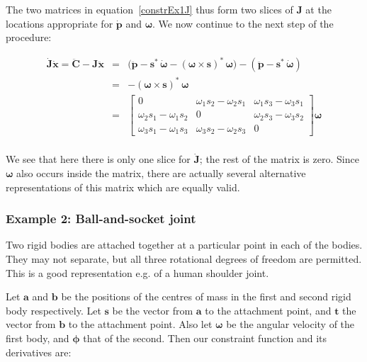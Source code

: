 The two matrices in equation~\ref{constrEx1J} thus form two slices of $\mathbf{J}$ at
the locations appropriate for $\dot{\mathbf{p}}$ and $\bm{\omega}$. We now continue to the
next step of the procedure:

\begin{eqnarray}
\dot{\mathbf{J}}\dot{\mathbf{x}} = 
\ddot{\mathbf{C}} - \mathbf{J}\ddot{\mathbf{x}} &=&
    \big(\ddot{\mathbf{p}} - \mathbf{s}^*\,\dot{\bm{\omega}} -
    (\bm{\omega}\times\mathbf{s})^*\,\bm{\omega}\big) -
    (\ddot{\mathbf{p}} - \mathbf{s}^*\,\dot{\bm{\omega}}) \nonumber\\
& = & -(\bm{\omega}\times\mathbf{s})^*\,\bm{\omega} \nonumber\\
& = & \left[\begin{array}{ccc} 0 &
    \omega_1 s_2 - \omega_2 s_1 &
    \omega_1 s_3 - \omega_3 s_1 \\
    \omega_2 s_1 - \omega_1 s_2 & 0 &
    \omega_2 s_3 - \omega_3 s_2 \\
    \omega_3 s_1 - \omega_1 s_3 &
    \omega_3 s_2 - \omega_2 s_3 & 0
    \end{array}\right] \bm{\omega} \nonumber\\\label{constrEx1JDot}
\end{eqnarray}

We see that here there is only one slice for $\dot{\mathbf{J}}$; the rest of the matrix
is zero. Since $\bm{\omega}$ also occurs inside the matrix, there are actually several
alternative representations of this matrix which are equally valid.

\subsubsection{Example 2: Ball-and-socket joint}

Two rigid bodies are attached together at a particular point in each of the bodies.
They may not separate, but all three rotational degrees of freedom are permitted. This is
a good representation e.g. of a human shoulder joint.

Let $\mathbf{a}$ and $\mathbf{b}$ be the positions of the centres of mass in the first and
second rigid body respectively. Let $\mathbf{s}$ be the vector from $\mathbf{a}$ to the 
attachment point, and $\mathbf{t}$ the vector from $\mathbf{b}$ to the attachment point.
Also let $\bm{\omega}$ be the angular velocity of the first body, and $\bm{\phi}$ that
of the second. Then our constraint function and its derivatives are:


